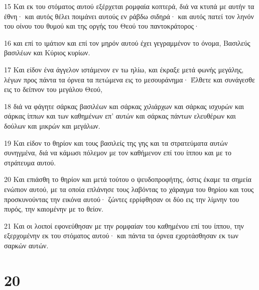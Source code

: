 \par 15 Και εκ του στόματος αυτού εξέρχεται ρομφαία κοπτερά, διά να κτυπά με αυτήν τα έθνη· και αυτός θέλει ποιμάνει αυτούς εν ράβδω σιδηρά· και αυτός πατεί τον ληνόν του οίνου του θυμού και της οργής του Θεού του παντοκράτορος·
\par 16 και επί το ιμάτιον και επί τον μηρόν αυτού έχει γεγραμμένον το όνομα, Βασιλεύς βασιλέων και Κύριος κυρίων.
\par 17 Και είδον ένα άγγελον ιστάμενον εν τω ηλίω, και έκραξε μετά φωνής μεγάλης, λέγων προς πάντα τα όρνεα τα πετώμενα εις το μεσουράνημα· Έλθετε και συνάγεσθε εις το δείπνον του μεγάλου Θεού,
\par 18 διά να φάγητε σάρκας βασιλέων και σάρκας χιλιάρχων και σάρκας ισχυρών και σάρκας ίππων και των καθημένων επ' αυτών και σάρκας πάντων ελευθέρων και δούλων και μικρών και μεγάλων.
\par 19 Και είδον το θηρίον και τους βασιλείς της γης και τα στρατεύματα αυτών συνηγμένα, διά να κάμωσι πόλεμον με τον καθήμενον επί του ίππου και με το στράτευμα αυτού.
\par 20 Και επιάσθη το θηρίον και μετά τούτου ο ψευδοπροφήτης, όστις έκαμε τα σημεία ενώπιον αυτού, με τα οποία επλάνησε τους λαβόντας το χάραγμα του θηρίου και τους προσκυνούντας την εικόνα αυτού· ζώντες ερρίφθησαν οι δύο εις την λίμνην του πυρός, την καιομένην με το θείον.
\par 21 Και οι λοιποί εφονεύθησαν με την ρομφαίαν του καθημένου επί του ίππου, την εξερχομένην εκ του στόματος αυτού· και πάντα τα όρνεα εχορτάσθησαν εκ των σαρκών αυτών.

\chapter{20}

